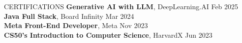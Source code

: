 \documentclass{resume}
\begin{document}


\begin{rSection}{CERTIFICATIONS}
\textbf{Generative AI with LLM}, DeepLearning.AI \hfill {Feb 2025}\\
\textbf{Java Full Stack}, Board Infinity \hfill {Mar 2024}\\
\textbf{Meta Front-End Developer}, Meta \hfill {Nov 2023}\\
\textbf{CS50's Introduction to Computer Science}, HarvardX \hfill {Jun 2023}
\end{rSection}
\end{document}
